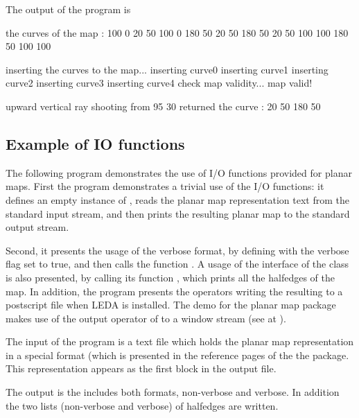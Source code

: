 The output of the program is

\begin{ccExampleCode}
the curves of the map :
100 0 20 50
100 0 180 50
20 50 180 50
20 50 100 100
180 50 100 100

inserting the curves to the map...
inserting curve0
inserting curve1
inserting curve2
inserting curve3
inserting curve4
check map validity... map valid!

upward vertical ray shooting from 95 30
returned the curve : 20 50 180 50

\end{ccExampleCode}

\subsection{Example of IO functions}
\label{PM_sec:example9}

The following program demonstrates the use of I/O functions provided
for planar maps. 
First the program demonstrates a trivial use of the I/O functions: 
it defines an empty instance of , 
reads the planar map representation text from the standard input stream, 
and then prints the resulting planar map to the standard output stream.

Second, it presents the usage of the verbose format, 
by defining  with the verbose flag set to true, 
and then calls the function .
A usage of the interface of the class  is also
presented, by calling its function , which
prints all the halfedges of the map. In addition, the program presents
the operators writing the resulting   to a postscript
file when LEDA is installed. The demo for the planar map package makes
use of the output operator of  to a
window stream  (see at  ).   



The input of the program is a text file which holds the planar map
representation in a special format (which is presented in the
reference pages of the the  package.
This representation appears as the first block in the output file.
 

The output is the  includes both formats, non-verbose
and verbose. In addition the two lists (non-verbose and verbose) of
halfedges are written.

